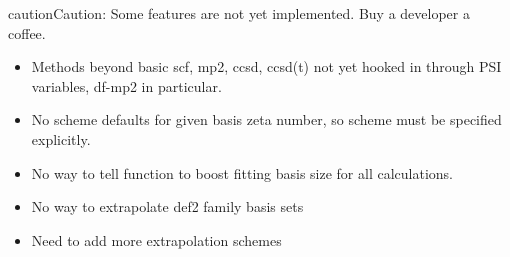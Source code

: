 \documentclass[letterpaper,10pt,english]{sphinxmanual}
\begin{document}
\begin{fulllineitems}
\begin{notice}{caution}{Caution:}
Some features are not yet implemented. Buy a developer a coffee.
\begin{itemize}
\item {} 
Methods beyond basic scf, mp2, ccsd, ccsd(t) not yet hooked in through PSI variables, df-mp2 in particular.

\item {} 
No scheme defaults for given basis zeta number, so scheme must be specified explicitly.

\item {} 
No way to tell function to boost fitting basis size for all calculations.

\item {} 
No way to extrapolate def2 family basis sets

\item {} 
Need to add more extrapolation schemes

\end{itemize}
\end{notice}


\end{fulllineitems}
\end{document}

